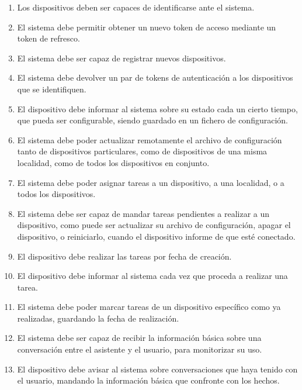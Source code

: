 \label{req.fun}
\begin{enumerate}[label=RF\arabic* -]
    \item Los dispositivos deben ser capaces de identificarse ante el sistema.

    \item El sistema debe permitir obtener un nuevo token de acceso mediante un token de refresco.

    \item El sistema debe ser capaz de registrar nuevos dispositivos.

    \item El sistema debe devolver un par de tokens de autenticación a los dispositivos que se identifiquen.

    \item El dispositivo debe informar al sistema sobre su estado cada un cierto tiempo, que pueda ser configurable, siendo guardado en un fichero de configuración.

    \item El sistema debe poder actualizar remotamente el archivo de configuración tanto de dispositivos particulares, como de dispositivos de una misma localidad, como de todos los dispositivos en conjunto.

    \item El sistema debe poder asignar tareas a un dispositivo, a una localidad, o a todos los dispositivos.

    \item El sistema debe ser capaz de mandar tareas pendientes a realizar a un dispositivo, como puede ser actualizar su archivo de configuración, apagar el dispositivo, o reiniciarlo, cuando el dispositivo informe de que esté conectado.

    \item El dispositivo debe realizar las tareas por fecha de creación.

    \item El dispositivo debe informar al sistema cada vez que proceda a realizar una tarea.

    \item El sistema debe poder marcar tareas de un dispositivo específico como ya realizadas, guardando la fecha de realización.

    \item El sistema debe ser capaz de recibir la información básica sobre una conversación entre el asistente y el usuario, para monitorizar su uso.

    \item El dispositivo debe avisar al sistema sobre conversaciones que haya tenido con el usuario, mandando la información básica que confronte con los hechos.


\end{enumerate}
